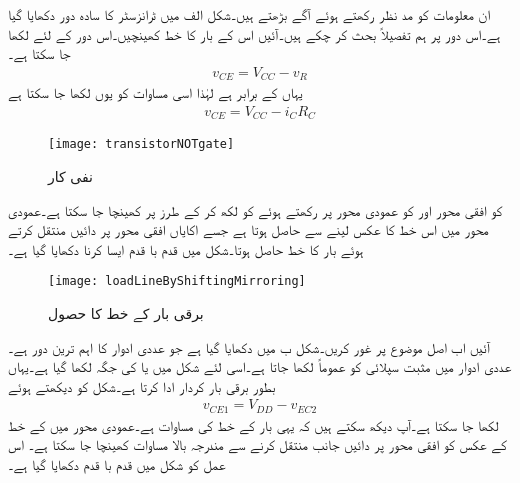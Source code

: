 ان معلومات کو مد نظر رکھتے ہوئے آگے بڑھتے ہیں۔شکل  الف میں ٹرانزسٹر کا سادہ دور دکھایا گیا ہے۔اس دور پر ہم تفصیلاً بحث کر چکے ہیں۔آئیں اس کے بار کا خط کھینچیں۔اس دور کے لئے لکھا جا سکتا ہے۔
\begin{align*}
v_{CE}=V_{CC}-v_R
\end{align*}
یہاں  کے برابر ہے لہٰذا اسی مساوات کو یوں لکھا جا سکتا ہے
 \begin{align*}
v_{CE}=V_{CC}-i_C R_C
\end{align*}
%
\begin{figure}
\centering
\texttt{[image: transistorNOTgate]}
\caption{نفی کار}
\label{شکل_ٹرانزسٹر_نفی_کار}
\end{figure}
 کو افقی محور اور  کو عمودی محور پر رکھتے  ہوئے   کو  لکھ کر  کے طرز پر کھینچا جا سکتا ہے۔عمودی محور میں اس خط کا عکس لینے سے  حاصل ہوتا ہے جسے  اکایاں افقی محور پر دائیں منتقل کرتے ہوئے بار کا خط  حاصل ہوتا۔شکل  میں قدم با قدم ایسا کرنا دکھایا گیا ہے۔
\begin{figure}
\centering
\texttt{[image: loadLineByShiftingMirroring]}
\caption{برقی بار کے خط کا حصول }
\label{شکل_ٹرانزسٹر_برقی_بار_کے_حصول_کا_دوسرا_طریقہ}
\end{figure}

آئیں اب اصل موضوع پر غور کریں۔شکل  ب میں   دکھایا گیا ہے جو عددی ادوار کا اہم ترین دور ہے۔عددی ادوار میں مثبت سپلائی کو  عموماً  لکھا جاتا ہے۔اسی لئے شکل میں  یا  کی جگہ  لکھا گیا ہے۔یہاں  بطور برقی بار کردار ادا کرتا ہے۔شکل کو دیکھتے ہوئے
\begin{align*}
v_{CE1}=V_{DD}-v_{EC2}
\end{align*}
لکھا جا سکتا ہے۔آپ دیکھ سکتے ہیں کہ یہی  بار کے خط کی مساوات ہے۔عمودی محور میں  کے  خط کے عکس کو افقی محور پر دائیں جانب  منتقل کرنے سے مندرجہ بالا مساوات کھینچا جا سکتا ہے۔ اس عمل کو شکل  میں قدم با قدم دکھایا گیا ہے۔

